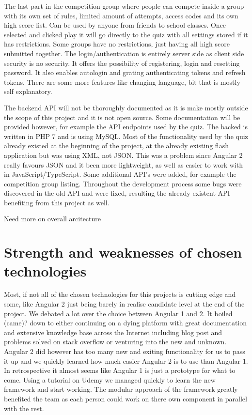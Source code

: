 The last part in the competition group where people can compete inside a group with its own set of rules, limited amount of attempts, access codes and its own high score list. Can be used by anyone from friends to school classes. Once selected and clicked play it will go directly to the quiz with all settings stored if it has restrictions. Some groups have no restrictions, just having all high score submitted together. The login/authentication is entirely server side as client side security is no security. It offers the possibility of registering, login and resetting password. It also enables autologin and grating authenticating tokens and refresh tokens. There are some more features like  changing language, bit that is mostly self explanatory. 


The backend API will not be thoroughly documented as it is make mostly outside the scope of this project and it is not open source. Some documentation will be provided however, for example the API endpoints used by the quiz. The backed is written in PHP 7 and is using MySQL. Most of the functionality used by the quiz already existed at the beginning of the project, at the already existing flash application but was using XML, not JSON. This was a problem since Angular 2 really favours JSON and it been more lightweight, as well as easier to work with in JavaScript/TypeScript. Some additional API's were added, for example the competition group listing. Throughout the development process some bugs were discovered in the old API  and were fixed, resulting  the already existent API benefiting from this project as well. 

Need more on overall arcitecture

\section{Strength and weaknesses of chosen technologies}
\label{sec:stregthandwic}
Most, if not all of the chosen technologies for this projects is cutting edge and some, like Angular 2 just being  barely in realise candidate level at the end of the project. We debated a lot over the choice between Angular 1 and 2. It boiled (came)? down to either continuing on a dying platform with great documentation and extensive knowledge base across the Internet including blog post and problems solved on stack overflow or venturing into the new and unknown. Angular 2 did however has too many new and exiting functionality for us to pass it up and we quickly learned how much easier Angular 2 is to use than Angular 1. In retrospective it almost seems like Angular 1 is just a prototype for what to come. Using a tutorial on Udemy \cite{TheCo73:online} we managed quickly to learn the new framework and start working. The modular approach of the framework greatly benefited the team as each person could work on there own component in parallel with the rest.

